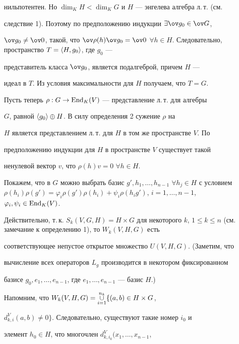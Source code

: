 нильпотентен. Но $\dim_K H<\dim_K G$ и $H$ --- энгелева алгебра л.\,т. (см. 


следствие 1). Поэтому по предположению индукции $\exists\ov g_0\in\ov G$, 


$\ov g_0\ne\ov 0$, такой, что $\ov\rho(h)\ov g_0=\ov 0$ $\forall 


h\in H$. Следовательно, пространство $T=\la H,g_0\ra$, где $g_0$ --- 


представитель класса $\ov g_0$, является подалгеброй, причем $H$ --- 


идеал в $T$. Из условия максимальности для $H$ получаем, что $T=G$.  


 


Пусть теперь $\rho:G\to\operatorname{End}_K(V)$ --- представление л.\,т. для алгебры 


$G$, равной $\langle g_0\rangle\oplus H$. В силу определения 2 сужение $\rho$ на 


$H$ является представлением л.\,т. для $H$ в том же пространстве $V$. По 


предположению индукции для $H$ в пространстве $V$ существует такой 


ненулевой вектор $v$, что $\rho(h)v=0$ $\forall h\in H$.  


 


Покажем, что в $G$ можно выбрать базис $g',h_1,\dotsc,h_{n-1}$ $\forall 


h_j\in H$ с условием $\rho(h_i)\rho(g')=\varphi_i\rho(g')\rho(h_i)+ 


\psi_i\rho(h_i g')$, $i=1,\dotsc,n-1$, $\varphi_i,\psi_i\in\End_K(V)$. 


Действительно, т.\,к. $S_k(V,G,H)=H\times G$ для некоторого $k$, $1\le 


k\le n$ (см. замечание к определению 1), то $W_k(V,H,G)$ есть 


соответствующее непустое открытое множество $U(V,H,G)$. (Заметим, что 


вычисление всех операторов $L_g$ производится в некотором фиксированном 


базисе $g_0,e_1,\dotsc,e_{n-1}$, где $e_1,\dotsc,e_{n-1}$ --- базис $H$.) 


Напомним, что $W_k(V,H,G)= \mathop{\cup}\limits^{n_k}_{i=1}\{(a,b)\in H\times G$, 


$d^V_{k,i}(a,b)\ne0\}$. Следовательно, существуют такие номер $i_0$ и 


элемент $h_0\in H$, что многочлен $d^V_{k,i_0}(x_1,\dotsc,x_{n-1}$, 


